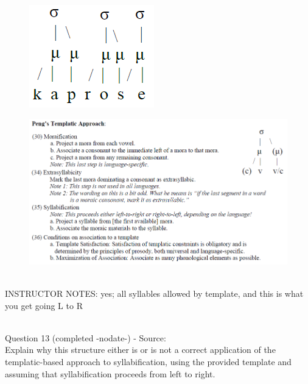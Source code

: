 \documentclass[12pt]{article}
\begin{document}
\begin{figure}[H]
\includegraphics{../images/pengtemplate_kaprosse_yes.png}
\end{figure}
\begin{figure}[H]
\includegraphics{../images/peng_template_withdiagram.png}
\end{figure}

~\\
INSTRUCTOR NOTES: yes; all syllables allowed by template, and this is what you get going L to R


~\\

{\large Question 13} (completed -nodate-) - Source: \\

Explain why this structure either is or is not a correct application of the templatic-based approach to syllabification, using the provided template and assuming that syllabification proceeds from left to right.\\
\end{document}
